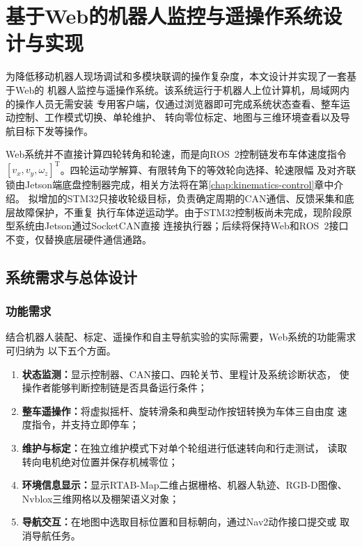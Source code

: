 
\chapter{基于Web的机器人监控与遥操作系统设计与实现}
\label{chap:web-control}

为降低移动机器人现场调试和多模块联调的操作复杂度，本文设计并实现了一套基于Web的
机器人监控与遥操作系统。该系统运行于机器人上位计算机，局域网内的操作人员无需安装
专用客户端，仅通过浏览器即可完成系统状态查看、整车运动控制、工作模式切换、单轮维护、
转向零位标定、地图与三维环境查看以及导航目标下发等操作。

Web系统并不直接计算四轮转角和轮速，而是向ROS~2控制链发布车体速度指令
$[v_x,v_y,\omega_z]^{\mathrm T}$。四轮运动学解算、有限转角下的等效轮向选择、轮速限幅
及对齐联锁由Jetson端底盘控制器完成，相关方法将在第\ref{chap:kinematics-control}章中介绍。
拟增加的STM32只接收轮级目标，负责确定周期的CAN通信、反馈采集和底层故障保护，不重复
执行车体逆运动学。由于STM32控制板尚未完成，现阶段原型系统由Jetson通过SocketCAN直接
连接执行器；后续将保持Web和ROS~2接口不变，仅替换底层硬件通信通路。

\section{系统需求与总体设计}

\subsection{功能需求}

结合机器人装配、标定、遥操作和自主导航实验的实际需要，Web系统的功能需求可归纳为
以下五个方面。

\begin{enumerate}
    \item \textbf{状态监测：}显示控制器、CAN接口、四轮关节、里程计及系统诊断状态，
          使操作者能够判断控制链是否具备运行条件；
    \item \textbf{整车遥操作：}将虚拟摇杆、旋转滑条和典型动作按钮转换为车体三自由度
          速度指令，并支持立即停车；
    \item \textbf{维护与标定：}在独立维护模式下对单个轮组进行低速转向和行走测试，
          读取转向电机绝对位置并保存机械零位；
    \item \textbf{环境信息显示：}显示RTAB-Map二维占据栅格、机器人轨迹、RGB-D图像、
          Nvblox三维网格以及棚架语义对象；
    \item \textbf{导航交互：}在地图中选取目标位置和目标朝向，通过Nav2动作接口提交或
          取消导航任务。
\end{enumerate}

